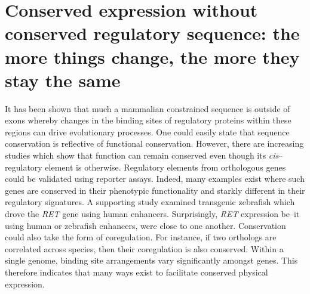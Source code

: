 \documentclass{article}
\begin{document}
\section*{Conserved expression without conserved regulatory sequence: the more things change, the more they stay the same \cite{weirauch-trendsgen-2010}}
	 It has been shown that much a mammalian constrained sequence is outside of exons whereby changes in the binding sites of
	 regulatory proteins within these regions can drive evolutionary processes. One could easily state that sequence conservation is
	 reflective of functional conservation. However, there are increasing studies which show that function can remain conserved even
	 though its \textit{cis}--regulatory element is otherwise. Regulatory elements from orthologous genes could be validated using
	 reporter assays. Indeed, many examples exist where such genes are conserved in their phenotypic functionality and starkly different in 
	 their regulatory signatures. A supporting study examined transgenic zebrafish which drove the \textit{RET} gene using human enhancers. Surprisingly, 
	 \textit{RET} expression be--it using human or zebrafish enhancers, were close to one another.
	 Conservation could also take the form of coregulation. For instance, if two orthologs are correlated across species, then their coregulation 
	 is also conserved.	Within a single genome, binding site arrangements vary significantly amongst genes. This therefore indicates that many ways exist to
	 facilitate conserved physical expression.
	 
\end{document}
